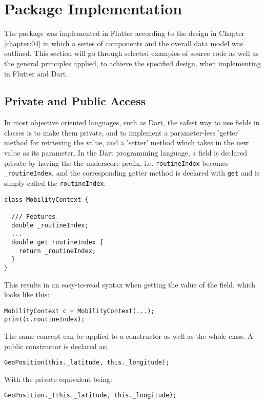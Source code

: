 \section{Package Implementation}
The package was implemented in Flutter according to the design in Chapter \ref{chapter:04} in which a series of components and the overall data model was outlined. This section will go through selected examples of source code as well as the general principles applied, to achieve the specified design, when implementing in Flutter and Dart.

\subsection{Private and Public Access}
In most objective oriented languages, such as Dart, the safest way to use fields in classes is to make them private, and to implement a parameter-less 'getter' method for retrieving the value, and a 'setter' method which takes in the new value as its parameter. In the Dart programming language, a field is declared private by having the the underscore prefix, i.e. \verb|routineIndex| becomes \verb|_routineIndex|, and the corresponding getter method is declared with \verb|get| and is simply called the \verb|routineIndex|:

\begin{verbatim}
class MobilityContext {

  /// Features
  double _routineIndex;
  ...
  double get routineIndex {
    return _routineIndex;
  }
}
\end{verbatim}

This results in an easy-to-read syntax when getting the value of the field, which looks like this:

\begin{verbatim}
MobilityContext c = MobilityContext(...);
print(c.routineIndex);
\end{verbatim}

The same concept can be applied to a constructor as well as the whole class. A public constructor is declared as:
\begin{verbatim}
GeoPosition(this._latitude, this._longitude);
\end{verbatim}

With the private equivalent being:

\begin{verbatim}
GeoPosition._(this._latitude, this._longitude);
\end{verbatim}

